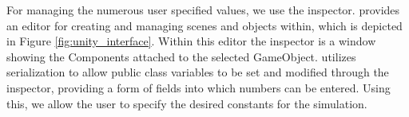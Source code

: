 	For managing the numerous user specified values, we use the \unity{} inspector.  \unity{} provides an editor for creating and managing scenes and objects within, which is depicted in Figure \ref{fig:unity_interface}.  Within this editor the inspector is a window showing the Components attached to the selected GameObject.  \unity{} utilizes serialization to allow public class variables to be set and modified through the inspector, providing a form of fields into which numbers can be entered.  Using this, we allow the user to specify the desired constants for the simulation.